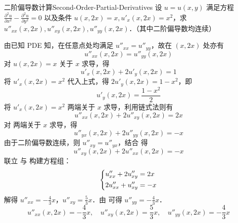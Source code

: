 \begin{problem}{二阶偏导数计算}{Second-Order-Partial-Derivatives}
    设 $u = u(x, y)$ 满足方程 $\frac{\partial^2 u}{\partial x^2} - \frac{\partial^2 u}{\partial y^2} = 0$ 以及条件 $u(x, 2x) = x, u'_x(x, 2x) = x^2$，求 $u''_{xx}(x, 2x), u''_{xy}(x, 2x), u''_{yy}(x, 2x)$．（其中二阶偏导数均连续）
\end{problem}

\begin{solution}
    由已知 PDE 知，在任意点处均满足 $u''_{xx} = u''_{yy}$，故在 $(x, 2x)$ 处亦有
    \begin{equation}\label{eq:pde-1}
        u''_{xx}(x, 2x) = u''_{yy}(x, 2x)
    \end{equation}
    对 $u(x, 2x) = x$ 关于 $x$ 求导，得
    \begin{equation}
        u'_x(x, 2x) + 2u'_y(x, 2x) = 1
    \end{equation}
    将 $u'_x(x, 2x) = x^2$ 代入上式，得 $2u'_y(x, 2x) = 1 - x^2$，即
    \begin{equation}\label{eq:uy-val}
        u'_y(x, 2x) = \frac{1 - x^2}{2}
    \end{equation}
    将 $u'_x(x, 2x) = x^2$ 两端关于 $x$ 求导，利用链式法则有
    \begin{equation}\label{eq:uxx-1}
        u''_{xx}(x, 2x) + 2u''_{xy}(x, 2x) = 2x
    \end{equation}
    对  两端关于 $x$ 求导，得
    \begin{equation}
        u''_{yx}(x, 2x) + 2u''_{yy}(x, 2x) = -x
    \end{equation}
    由于二阶偏导数连续，则 $u''_{xy} = u''_{yx}$，结合  得
    \begin{equation}\label{eq:uxx-2}
        u''_{xy}(x, 2x) + 2u''_{xx}(x, 2x) = -x
    \end{equation}
    联立  与  构建方程组：
    \begin{equation}
        \begin{dcases}
            u''_{xx} + 2u''_{xy} = 2x \\
            2u''_{xx} + u''_{xy} = -x
        \end{dcases}
    \end{equation}
    解得 $u''_{xx} = -\frac{4}{3}x$，$u''_{xy} = \frac{5}{3}x$．由  可得 $u''_{yy} = -\frac{4}{3}x$．
    \begin{equation}
        \boxed{u''_{xx}(x, 2x) = -\frac{4}{3}x, \quad u''_{xy}(x, 2x) = \frac{5}{3}x, \quad u''_{yy}(x, 2x) = -\frac{4}{3}x}
    \end{equation}
\end{solution}


